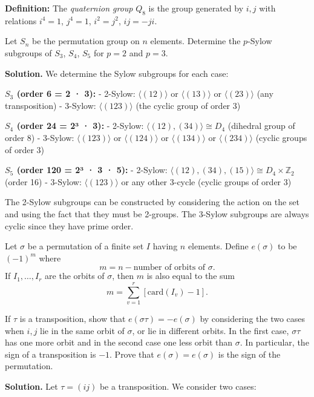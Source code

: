 \textbf{Definition:} The \textit{quaternion group} $Q_8$ is the group generated by $i, j$ with relations $i^4 = 1$, $j^4 = 1$, $i^2 = j^2$, $ij = -ji$.

\begin{problembox}
Let $S_n$ be the permutation group on $n$ elements. Determine the $p$-Sylow subgroups of $S_3$, $S_4$, $S_5$ for $p = 2$ and $p = 3$.
\end{problembox}

\noindent\textbf{Solution.} We determine the Sylow subgroups for each case:

\textbf{$S_3$ (order 6 = 2 · 3):}
- 2-Sylow: $\langle (12) \rangle$ or $\langle (13) \rangle$ or $\langle (23) \rangle$ (any transposition)
- 3-Sylow: $\langle (123) \rangle$ (the cyclic group of order 3)

\textbf{$S_4$ (order 24 = 2³ · 3):}
- 2-Sylow: $\langle (12), (34) \rangle \cong D_4$ (dihedral group of order 8)
- 3-Sylow: $\langle (123) \rangle$ or $\langle (124) \rangle$ or $\langle (134) \rangle$ or $\langle (234) \rangle$ (cyclic groups of order 3)

\textbf{$S_5$ (order 120 = 2³ · 3 · 5):}
- 2-Sylow: $\langle (12), (34), (15) \rangle \cong D_4 \times \mathbb{Z}_2$ (order 16)
- 3-Sylow: $\langle (123) \rangle$ or any other 3-cycle (cyclic groups of order 3)

The 2-Sylow subgroups can be constructed by considering the action on the set and using the fact that they must be 2-groups. The 3-Sylow subgroups are always cyclic since they have prime order.

\begin{problembox}
Let $\sigma$ be a permutation of a finite set $I$ having $n$ elements. Define $e(\sigma)$ to be $(-1)^m$ where
\[m = n - \text{number of orbits of } \sigma.\]
If $I_1, \ldots, I_r$ are the orbits of $\sigma$, then $m$ is also equal to the sum
\[m = \sum_{v=1}^r [\text{card}(I_v) - 1].\]

If $\tau$ is a transposition, show that $e(\sigma\tau) = -e(\sigma)$ by considering the two cases when $i, j$ lie in the same orbit of $\sigma$, or lie in different orbits. In the first case, $\sigma\tau$ has one more orbit and in the second case one less orbit than $\sigma$. In particular, the sign of a transposition is $-1$. Prove that $e(\sigma) = e(\sigma)$ is the sign of the permutation.
\end{problembox}

\noindent\textbf{Solution.} Let $\tau = (ij)$ be a transposition. We consider two cases:

